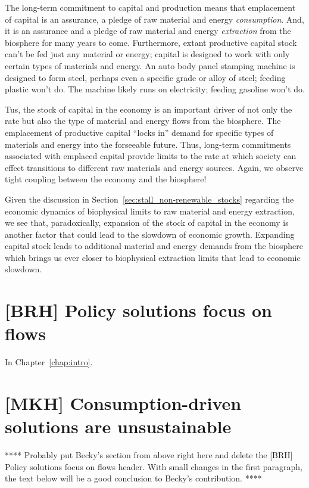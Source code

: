 The long-term commitment to capital and production means that 
emplacement of capital is an assurance, a pledge of 
raw material and energy \emph{consumption}.
And, it is an assurance and a pledge of raw material and energy \emph{extraction} 
from the biosphere for many years to come.
Furthermore, extant productive capital stock can't be fed just any material or energy;
capital is designed to work with only certain types of materials and energy.
An auto body panel stamping machine is designed to form steel, perhaps even a specific 
grade or alloy of steel;
feeding plastic won't do.
The machine likely runs on electricity; 
feeding gasoline won't do.

Tus, the stock of capital in the economy 
is an important driver of not only 
the rate but also  
the type of
material and energy flows from the biosphere.
The emplacement of productive capital
``locks in'' demand for specific types of materials and energy 
into the forseeable future.
Thus, long-term commitments associated with emplaced capital
provide limits to the rate at which society can effect
transitions to different raw materials and energy sources.
Again, we observe tight coupling between the economy and the biosphere!

Given the discussion in Section~\ref{sec:stall_non-renewable_stocks}
regarding the economic dynamics 
of biophysical limits to raw material and energy extraction,
we see that, paradoxically, 
expansion of the stock of capital in the economy 
is another factor that could lead to the slowdown of economic growth.
Expanding capital stock leads to additional material and energy demands from the biosphere
which brings us ever closer to biophysical extraction limits 
that lead to economic slowdown.


\section{[BRH] Policy solutions focus on flows}
\label{sec:policy_flows}

In Chapter~\ref{chap:intro}.


\section{[MKH] Consumption-driven solutions are unsustainable}
\label{sec:consumption_unsustainable}

**** Probably put Becky's section from above right here and
delete the [BRH] Policy solutions focus on flows header.
With small changes in the first paragraph, 
the text below will be a good conclusion to 
Becky's contribution. ****

